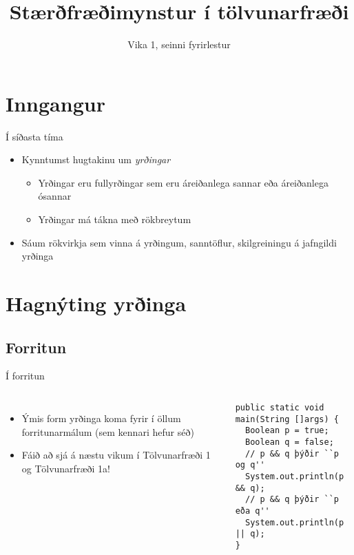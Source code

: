 \documentclass[handout]{beamer}
\title{Stærðfræðimynstur í tölvunarfræði}
\subtitle{Vika 1, seinni fyrirlestur}
\begin{document}
\begin{frame}
\titlepage
\end{frame}

\section{Inngangur}

\begin{frame}{Í síðasta tíma}
\begin{itemize}
 \item Kynntumst hugtakinu um \emph{yrðingar}
 \begin{itemize}
  \item Yrðingar eru fullyrðingar sem eru áreiðanlega sannar eða áreiðanlega ósannar
  \item Yrðingar má tákna með rökbreytum
 \end{itemize}
 \item Sáum rökvirkja sem vinna á yrðingum, sanntöflur, skilgreiningu á jafngildi yrðinga
\end{itemize}
\end{frame}

\section{Hagnýting yrðinga}

\subsection{Forritun}

\begin{frame}[fragile]{Í forritun}
\begin{columns}
\begin{itemize}
 \item Ýmis form yrðinga koma fyrir í öllum forritunarmálum (sem kennari hefur séð)
 \item Fáið að sjá á næstu vikum í Tölvunarfræði 1 og Tölvunarfræði 1a!
\end{itemize}
\begin{verbatim}
public static void main(String []args) {
  Boolean p = true;
  Boolean q = false;
  // p && q þýðir ``p og q''
  System.out.println(p && q);
  // p && q þýðir ``p eða q''
  System.out.println(p || q);
}
\end{verbatim}

\end{columns}
\end{frame}
\end{document}
